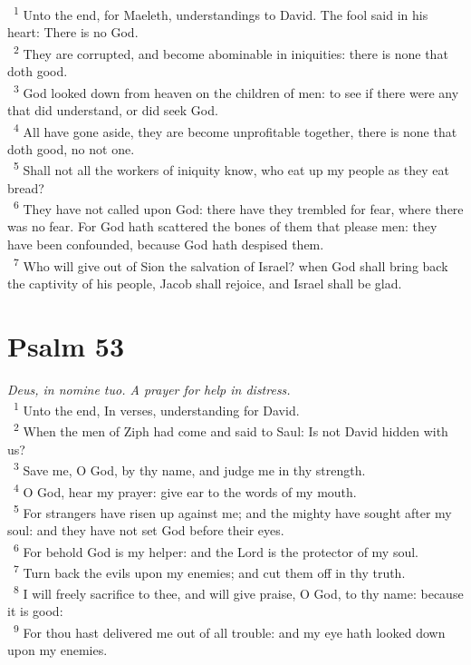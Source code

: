 \documentclass[a5paper,12pt]{article}
\begin{document}
\begin{multicols*}{2}
~\textsuperscript{1} Unto the end, for Maeleth, understandings to David. The fool said in his heart: There is no God.\\
~\textsuperscript{2} They are corrupted, and become abominable in iniquities: there is none that doth good.\\
~\textsuperscript{3} God looked down from heaven on the children of men: to see if there were any that did understand, or did seek God.\\
~\textsuperscript{4} All have gone aside, they are become unprofitable together, there is none that doth good, no not one.\\
~\textsuperscript{5} Shall not all the workers of iniquity know, who eat up my people as they eat bread?\\
~\textsuperscript{6} They have not called upon God: there have they trembled for fear, where there was no fear. For God hath scattered the bones of them that please men: they have been confounded, because God hath despised them.\\
~\textsuperscript{7} Who will give out of Sion the salvation of Israel? when God shall bring back the captivity of his people, Jacob shall rejoice, and Israel shall be glad.\\

\section{Psalm 53}
\label{sec:org6f3954c}
\emph{Deus, in nomine tuo. A prayer for help in distress.}\\

~\textsuperscript{1} Unto the end, In verses, understanding for David.\\
~\textsuperscript{2} When the men of Ziph had come and said to Saul: Is not David hidden with us?\\
~\textsuperscript{3} Save me, O God, by thy name, and judge me in thy strength.\\
~\textsuperscript{4} O God, hear my prayer: give ear to the words of my mouth.\\
~\textsuperscript{5} For strangers have risen up against me; and the mighty have sought after my soul: and they have not set God before their eyes.\\
~\textsuperscript{6} For behold God is my helper: and the Lord is the protector of my soul.\\
~\textsuperscript{7} Turn back the evils upon my enemies; and cut them off in thy truth.\\
~\textsuperscript{8} I will freely sacrifice to thee, and will give praise, O God, to thy name: because it is good:\\
~\textsuperscript{9} For thou hast delivered me out of all trouble: and my eye hath looked down upon my enemies.\\


\end{multicols*}
\end{document}
